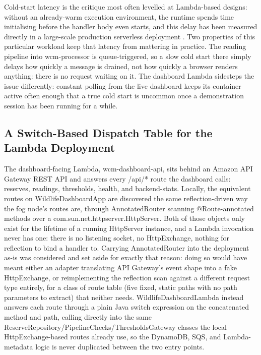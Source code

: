 \documentclass[conference,a4paper]{IEEEtran}
\begin{document}
Cold-start latency is the critique most often levelled at Lambda-based designs: without an already-warm execution environment, the runtime spends time initialising before the handler body even starts, and this delay has been measured directly in a large-scale production serverless deployment \cite{ref7}. Two properties of this particular workload keep that latency from mattering in practice. The reading pipeline into wcm-processor is queue-triggered, so a slow cold start there simply delays how quickly a message is drained, not how quickly a browser renders anything: there is no request waiting on it. The dashboard Lambda sidesteps the issue differently: constant polling from the live dashboard keeps its container active often enough that a true cold start is uncommon once a demonstration session has been running for a while.

\subsection{A Switch-Based Dispatch Table for the Lambda Deployment}

The dashboard-facing Lambda, wcm-dashboard-api, sits behind an Amazon API Gateway REST API and answers every /api/* route the dashboard calls: reserves, readings, thresholds, health, and backend-stats. Locally, the equivalent routes on WildlifeDashboardApp are discovered the same reflection-driven way the fog node's routes are, through AnnotatedRouter scanning @Route-annotated methods over a com.sun.net.httpserver.HttpServer. Both of those objects only exist for the lifetime of a running HttpServer instance, and a Lambda invocation never has one: there is no listening socket, no HttpExchange, nothing for reflection to bind a handler to. Carrying AnnotatedRouter into the deployment as-is was considered and set aside for exactly that reason: doing so would have meant either an adapter translating API Gateway's event shape into a fake HttpExchange, or reimplementing the reflection scan against a different request type entirely, for a class of route table (five fixed, static paths with no path parameters to extract) that neither needs. WildlifeDashboardLambda instead answers each route through a plain Java switch expression on the concatenated method and path, calling directly into the same ReserveRepository/PipelineChecks/ThresholdsGateway classes the local HttpExchange-based routes already use, so the DynamoDB, SQS, and Lambda-metadata logic is never duplicated between the two entry points.
\end{document}
